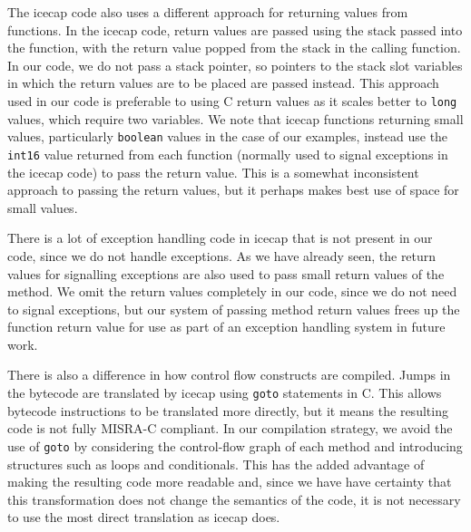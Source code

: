 {The icecap code also uses a different approach for returning values
from functions.
In the icecap code, return values are passed using the stack passed
into the function, with the return value popped from the stack in the
calling function.
In our code, we do not pass a stack pointer, so pointers to the stack
slot variables in which the return values are to be placed are passed
instead.
This approach used in our code is preferable to using C return values
as it scales better to \texttt{long} values, which require two
variables.
We note that icecap functions returning small values, particularly
\texttt{boolean} values in the case of our examples, instead use the
\texttt{int16} value returned from each function (normally used to
signal exceptions in the icecap code) to pass the return value.
This is a somewhat inconsistent approach to passing the return values,
but it perhaps makes best use of space for small values.

There is a lot of exception handling code in icecap that is not
present in our code, since we do not handle exceptions.
As we have already seen, the return values for signalling exceptions
are also used to pass small return values of the method.
We omit the return values completely in our code, since we do not need
to signal exceptions, but our system of passing method return values
frees up the function return value for use as part of an exception
handling system in future work.

There is also a difference in how control flow constructs are
compiled.
Jumps in the bytecode are translated by icecap using \texttt{goto}
statements in C.
This allows bytecode instructions to be translated more directly, but
it means the resulting code is not fully MISRA-C compliant.
In our compilation strategy, we avoid the use of \texttt{goto} by
considering the control-flow graph of each method and introducing
structures such as loops and conditionals.
This has the added advantage of making the resulting code more
readable and, since we have have certainty that this transformation
does not change the semantics of the code, it is not necessary to use
the most direct translation as icecap does.

}
